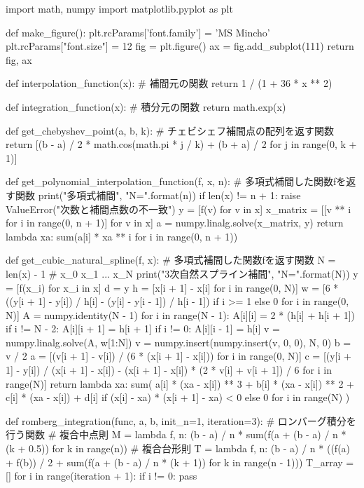 \documentclass{jsarticle}
\begin{document}
\pagebreak
\begin{spverbatim}
import math, numpy
import matplotlib.pyplot as plt


def make_figure():
    plt.rcParams['font.family'] = 'MS Mincho'
    plt.rcParams["font.size"] = 12
    fig = plt.figure()
    ax = fig.add_subplot(111)
    return fig, ax


def interpolation_function(x):  # 補間元の関数
    return 1 / (1 + 36 * x ** 2)


def integration_function(x):  # 積分元の関数
    return math.exp(x)


def get_chebyshev_point(a, b, k):  # チェビシェフ補間点の配列を返す関数
    return [(b - a) / 2 * math.cos(math.pi * j / k) + (b + a) / 2 for j in range(0, k + 1)]


def get_polynomial_interpolation_function(f, x, n):  # 多項式補間した関数fを返す関数
    print("多項式補間", "N={}".format(n))
    if len(x) != n + 1:
        raise ValueError("次数と補間点数の不一致")
    y = [f(v) for v in x]
    x_matrix = [[v ** i for i in range(0, n + 1)] for v in x]
    a = numpy.linalg.solve(x_matrix, y)
    return lambda xa: sum(a[i] * xa ** i for i in range(0, n + 1))


def get_cubic_natural_spline(f, x):  # 多項式補間した関数fを返す関数
    N = len(x) - 1  # x_0 x_1 ... x_N
    print("3次自然スプライン補間", "N={}".format(N))
    y = [f(x_i) for x_i in x]
    d = y
    h = [x[i + 1] - x[i] for i in range(0, N)]
    w = [6 * ((y[i + 1] - y[i]) / h[i] - (y[i] - y[i - 1]) / h[i - 1]) if i >= 1 else 0 for i in range(0, N)]
    A = numpy.identity(N - 1)
    for i in range(N - 1):
        A[i][i] = 2 * (h[i] + h[i + 1])
        if i != N - 2:
            A[i][i + 1] = h[i + 1]
        if i != 0:
            A[i][i - 1] = h[i]
    v = numpy.linalg.solve(A, w[1:N])
    v = numpy.insert(numpy.insert(v, 0, 0), N, 0)
    b = v / 2
    a = [(v[i + 1] - v[i]) / (6 * (x[i + 1] - x[i])) for i in range(0, N)]
    c = [(y[i + 1] - y[i]) / (x[i + 1] - x[i]) - (x[i + 1] - x[i]) * (2 * v[i] + v[i + 1]) / 6 for i in range(N)]
    return lambda xa: sum(
        a[i] * (xa - x[i]) ** 3 + b[i] * (xa - x[i]) ** 2 + c[i] * (xa - x[i]) + d[i]
        if (x[i] - xa) * (x[i + 1] - xa) < 0 else 0
        for i in range(N)
    )


def romberg_integration(func, a, b, init_n=1, iteration=3): # ロンバーグ積分を行う関数
    # 複合中点則
    M = lambda f, n: (b - a) / n * sum(f(a + (b - a) / n * (k + 0.5)) for k in range(n))
    # 複合台形則
    T = lambda f, n: (b - a) / n * ((f(a) + f(b)) / 2 + sum(f(a + (b - a) / n * (k + 1)) for k in range(n - 1)))
    T_array = []
    for i in range(iteration + 1):
        if i != 0:
            pass


\end{spverbatim}
\end{document}
